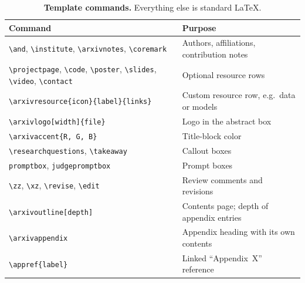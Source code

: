 \begin{table}[t]
\centering
\footnotesize
\setlength{\tabcolsep}{5pt}
\caption{\textbf{Template commands.} Everything else is standard \LaTeX.}
\label{tab:commands}
\begin{tabular}{@{} l l @{}}
\toprule
Command & Purpose \\
\midrule
\texttt{\textbackslash and}, \texttt{\textbackslash institute}, \texttt{\textbackslash arxivnotes}, \texttt{\textbackslash coremark} & Authors, affiliations, contribution notes \\
\texttt{\textbackslash projectpage}, \texttt{\textbackslash code}, \texttt{\textbackslash poster}, \texttt{\textbackslash slides}, \texttt{\textbackslash video}, \texttt{\textbackslash contact} & Optional resource rows \\
\texttt{\textbackslash arxivresource\{icon\}\{label\}\{links\}} & Custom resource row, e.g.\ data or models \\
\texttt{\textbackslash arxivlogo[width]\{file\}} & Logo in the abstract box \\
\texttt{\textbackslash arxivaccent\{R, G, B\}} & Title-block color \\
\texttt{\textbackslash researchquestions}, \texttt{\textbackslash takeaway} & Callout boxes \\
\texttt{promptbox}, \texttt{judgepromptbox} & Prompt boxes \\
\texttt{\textbackslash zz}, \texttt{\textbackslash xz}, \texttt{\textbackslash revise}, \texttt{\textbackslash edit} & Review comments and revisions \\
\texttt{\textbackslash arxivoutline[depth]} & Contents page; depth of appendix entries \\
\texttt{\textbackslash arxivappendix} & Appendix heading with its own contents \\
\texttt{\textbackslash appref\{label\}} & Linked ``Appendix~X'' reference \\
\bottomrule
\end{tabular}
\end{table}
